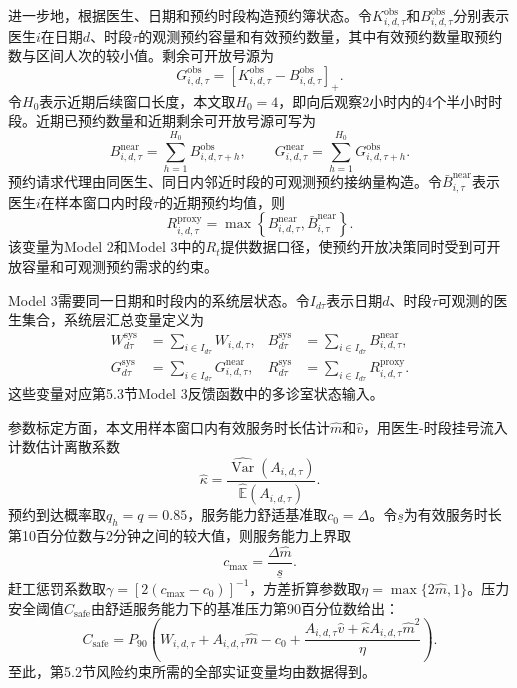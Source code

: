 \documentclass[a4paper,zihao=-4]{ctexart}
\newcommand{\E}{\mathbb{E}}
\newcommand{\Var}{\operatorname{Var}}
\numberwithin{figure}{section}
\numberwithin{table}{section}
\begin{document}
进一步地，根据医生、日期和预约时段构造预约簿状态。令$K_{i,d,\tau}^{\mathrm{obs}}$和$B_{i,d,\tau}^{\mathrm{obs}}$分别表示医生$i$在日期$d$、时段$\tau$的观测预约容量和有效预约数量，其中有效预约数量取预约数与区间人次的较小值。剩余可开放号源为
\begin{equation}
G_{i,d,\tau}^{\mathrm{obs}}
=\left[K_{i,d,\tau}^{\mathrm{obs}}-B_{i,d,\tau}^{\mathrm{obs}}\right]_+.
\end{equation}
令$H_0$表示近期后续窗口长度，本文取$H_0=4$，即向后观察2小时内的4个半小时时段。近期已预约数量和近期剩余可开放号源可写为
\begin{equation}
B_{i,d,\tau}^{\mathrm{near}}=\sum_{h=1}^{H_0}B_{i,d,\tau+h}^{\mathrm{obs}},\qquad
G_{i,d,\tau}^{\mathrm{near}}=\sum_{h=1}^{H_0}G_{i,d,\tau+h}^{\mathrm{obs}}.
\label{eq:empirical-near-book}
\end{equation}
预约请求代理由同医生、同日内邻近时段的可观测预约接纳量构造。令$\bar B_{i,\tau}^{\mathrm{near}}$表示医生$i$在样本窗口内时段$\tau$的近期预约均值，则
\begin{equation}
R_{i,d,\tau}^{\mathrm{proxy}}
=\max\left\{
B_{i,d,\tau}^{\mathrm{near}},
\bar B_{i,\tau}^{\mathrm{near}}
\right\}.
\label{eq:request-proxy}
\end{equation}
该变量为Model 2和Model 3中的$R_t$提供数据口径，使预约开放决策同时受到可开放容量和可观测预约需求的约束。

Model 3需要同一日期和时段内的系统层状态。令$I_{d\tau}$表示日期$d$、时段$\tau$可观测的医生集合，系统层汇总变量定义为
\begin{equation}
\begin{aligned}
W_{d\tau}^{\mathrm{sys}}&=\sum_{i\in I_{d\tau}}W_{i,d,\tau},&
B_{d\tau}^{\mathrm{sys}}&=\sum_{i\in I_{d\tau}}B_{i,d,\tau}^{\mathrm{near}},\\
G_{d\tau}^{\mathrm{sys}}&=\sum_{i\in I_{d\tau}}G_{i,d,\tau}^{\mathrm{near}},&
R_{d\tau}^{\mathrm{sys}}&=\sum_{i\in I_{d\tau}}R_{i,d,\tau}^{\mathrm{proxy}}.
\end{aligned}
\label{eq:empirical-system-state}
\end{equation}
这些变量对应第5.3节Model 3反馈函数中的多诊室状态输入。

参数标定方面，本文用样本窗口内有效服务时长估计$\hat m$和$\hat v$，用医生-时段挂号流入计数估计离散系数
\begin{equation}
\hat\kappa=\frac{\widehat{\Var}(A_{i,d,\tau})}{\widehat{\E}(A_{i,d,\tau})}.
\end{equation}
预约到达概率取$q_h=q=0.85$，服务能力舒适基准取$c_0=\Delta$。令$\underline s$为有效服务时长第10百分位数与2分钟之间的较大值，则服务能力上界取
\begin{equation}
c_{\max}=\frac{\Delta\hat m}{\underline s}.
\end{equation}
赶工惩罚系数取$\gamma=[2(c_{\max}-c_0)]^{-1}$，方差折算参数取$\eta=\max\{2\hat m,1\}$。压力安全阈值$C_{\mathrm{safe}}$由舒适服务能力下的基准压力第90百分位数给出：
\begin{equation}
C_{\mathrm{safe}}
=P_{90}\left(
W_{i,d,\tau}+A_{i,d,\tau}\hat m-c_0
+\frac{A_{i,d,\tau}\hat v+\hat\kappa A_{i,d,\tau}\hat m^2}{\eta}
\right).
\label{eq:empirical-safe-threshold}
\end{equation}
至此，第5.2节风险约束所需的全部实证变量均由数据得到。
\end{document}
